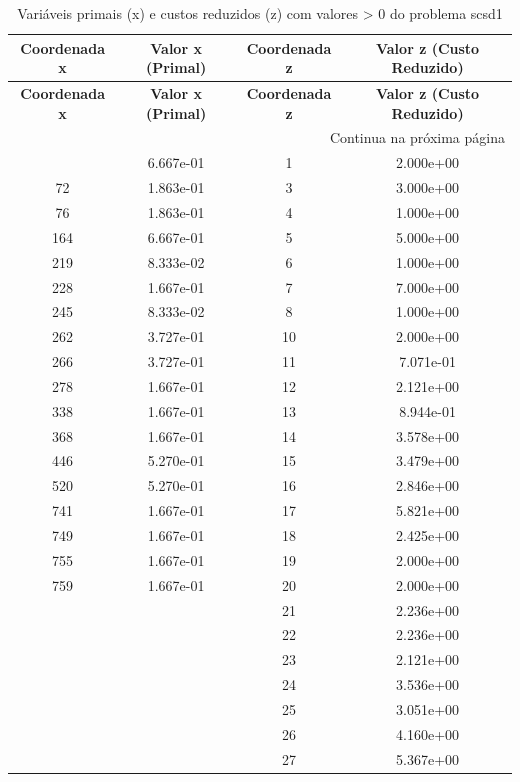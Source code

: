 \documentclass[12pt]{article}
\begin{document}
\begin{longtable}{@{}cccc@{}}
\caption{Variáveis primais (x) e custos reduzidos (z) com valores > 0 do problema scsd1} \\
\toprule
\textbf{Coordenada x} & \textbf{Valor x (Primal)} & \textbf{Coordenada z} & \textbf{Valor z (Custo Reduzido)} \\
\midrule
\endfirsthead

\toprule
\textbf{Coordenada x} & \textbf{Valor x (Primal)} & \textbf{Coordenada z} & \textbf{Valor z (Custo Reduzido)} \\
\midrule
\endhead

\midrule \multicolumn{4}{r}{{Continua na próxima página}} \\ \midrule
\endfoot

\bottomrule
\endlastfoot
64 & 6.667e-01 & 1 & 2.000e+00 \\
72 & 1.863e-01 & 3 & 3.000e+00 \\
76 & 1.863e-01 & 4 & 1.000e+00 \\
164 & 6.667e-01 & 5 & 5.000e+00 \\
219 & 8.333e-02 & 6 & 1.000e+00 \\
228 & 1.667e-01 & 7 & 7.000e+00 \\
245 & 8.333e-02 & 8 & 1.000e+00 \\
262 & 3.727e-01 & 10 & 2.000e+00 \\
266 & 3.727e-01 & 11 & 7.071e-01 \\
278 & 1.667e-01 & 12 & 2.121e+00 \\
338 & 1.667e-01 & 13 & 8.944e-01 \\
368 & 1.667e-01 & 14 & 3.578e+00 \\
446 & 5.270e-01 & 15 & 3.479e+00 \\
520 & 5.270e-01 & 16 & 2.846e+00 \\
741 & 1.667e-01 & 17 & 5.821e+00 \\
749 & 1.667e-01 & 18 & 2.425e+00 \\
755 & 1.667e-01 & 19 & 2.000e+00 \\
759 & 1.667e-01 & 20 & 2.000e+00 \\
 &  & 21 & 2.236e+00 \\
 &  & 22 & 2.236e+00 \\
 &  & 23 & 2.121e+00 \\
 &  & 24 & 3.536e+00 \\
 &  & 25 & 3.051e+00 \\
 &  & 26 & 4.160e+00 \\
 &  & 27 & 5.367e+00 \\

\end{longtable}
\end{document}

